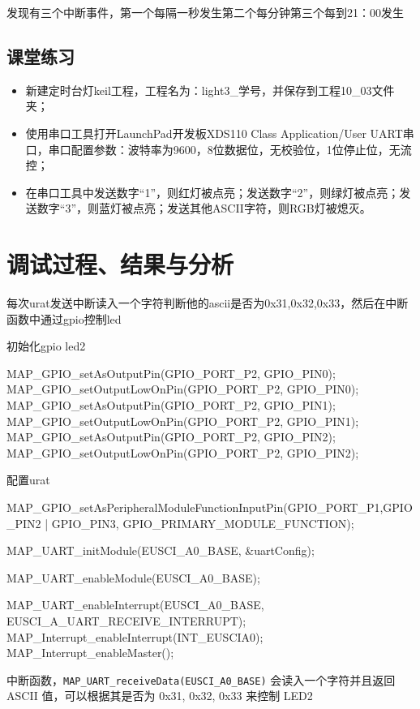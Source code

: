 \documentclass[a4paper,10pt,UTF8]{paper}
\numberwithin{equation}{section}
\numberwithin{figure}{section}
\begin{document}
发现有三个中断事件，第一个每隔一秒发生第二个每分钟第三个每到21：00发生

\subsection{课堂练习}

\begin{itemize}
  \item 新建定时台灯keil工程，工程名为：light3\_学号，并保存到工程10\_03文件夹；
  \item 使用串口工具打开LaunchPad开发板XDS110 Class Application/User UART串口，串口配置参数：波特率为9600，8位数据位，无校验位，1位停止位，无流控；
  \item 在串口工具中发送数字“1”，则红灯被点亮；发送数字“2”，则绿灯被点亮；发送数字“3”，则蓝灯被点亮；发送其他ASCII字符，则RGB灯被熄灭。
\end{itemize}

\section{调试过程、结果与分析}

每次urat发送中断读入一个字符判断他的ascii是否为0x31,0x32,0x33，然后在中断函数中通过gpio控制led

初始化gpio led2

\begin{ccode}
  MAP_GPIO_setAsOutputPin(GPIO_PORT_P2, GPIO_PIN0);
  MAP_GPIO_setOutputLowOnPin(GPIO_PORT_P2, GPIO_PIN0);
  MAP_GPIO_setAsOutputPin(GPIO_PORT_P2, GPIO_PIN1);
  MAP_GPIO_setOutputLowOnPin(GPIO_PORT_P2, GPIO_PIN1);
  MAP_GPIO_setAsOutputPin(GPIO_PORT_P2, GPIO_PIN2);
  MAP_GPIO_setOutputLowOnPin(GPIO_PORT_P2, GPIO_PIN2);
\end{ccode}

配置urat

\begin{ccode}
  MAP_GPIO_setAsPeripheralModuleFunctionInputPin(GPIO_PORT_P1,GPIO_PIN2 | GPIO_PIN3, GPIO_PRIMARY_MODULE_FUNCTION);
  
  MAP_UART_initModule(EUSCI_A0_BASE, &uartConfig);

  MAP_UART_enableModule(EUSCI_A0_BASE);
  
  MAP_UART_enableInterrupt(EUSCI_A0_BASE, EUSCI_A_UART_RECEIVE_INTERRUPT);
  MAP_Interrupt_enableInterrupt(INT_EUSCIA0);  
  MAP_Interrupt_enableMaster();    
\end{ccode}

中断函数，\texttt{MAP\_UART\_receiveData(EUSCI\_A0\_BASE)} 会读入一个字符并且返回 ASCII 值，可以根据其是否为 0x31, 0x32, 0x33 来控制 LED2
\end{document}
